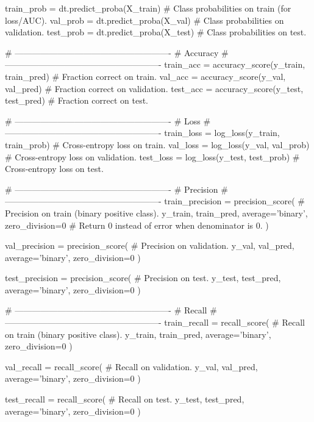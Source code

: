     train_prob = dt.predict_proba(X_train) # Class probabilities on train (for loss/AUC).
    val_prob = dt.predict_proba(X_val)     # Class probabilities on validation.
    test_prob = dt.predict_proba(X_test)   # Class probabilities on test.

    # -------------------------------------------------------
    # Accuracy
    # -------------------------------------------------------
    train_acc = accuracy_score(y_train, train_pred)  # Fraction correct on train.
    val_acc = accuracy_score(y_val, val_pred)        # Fraction correct on validation.
    test_acc = accuracy_score(y_test, test_pred)     # Fraction correct on test.

    # -------------------------------------------------------
    # Loss
    # -------------------------------------------------------
    train_loss = log_loss(y_train, train_prob)  # Cross-entropy loss on train.
    val_loss = log_loss(y_val, val_prob)         # Cross-entropy loss on validation.
    test_loss = log_loss(y_test, test_prob)      # Cross-entropy loss on test.

    # -------------------------------------------------------
    # Precision
    # -------------------------------------------------------
    train_precision = precision_score(     # Precision on train (binary positive class).
        y_train, train_pred,
        average='binary',
        zero_division=0                    # Return 0 instead of error when denominator is 0.
    )

    val_precision = precision_score(       # Precision on validation.
        y_val, val_pred,
        average='binary',
        zero_division=0
    )

    test_precision = precision_score(      # Precision on test.
        y_test, test_pred,
        average='binary',
        zero_division=0
    )

    # -------------------------------------------------------
    # Recall
    # -------------------------------------------------------
    train_recall = recall_score(           # Recall on train (binary positive class).
        y_train, train_pred,
        average='binary',
        zero_division=0
    )

    val_recall = recall_score(             # Recall on validation.
        y_val, val_pred,
        average='binary',
        zero_division=0
    )

    test_recall = recall_score(            # Recall on test.
        y_test, test_pred,
        average='binary',
        zero_division=0
    )

